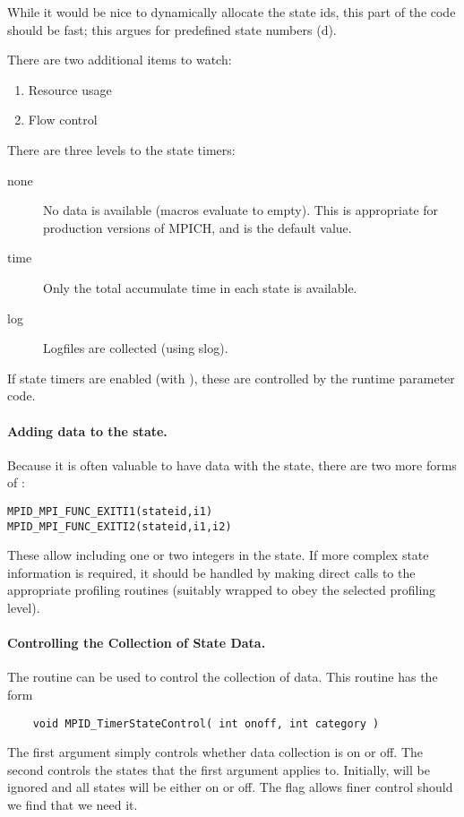 \documentclass{article}
\begin{document}
While it would be nice to dynamically allocate the state ids, this part of the
code should be fast; this argues for predefined state numbers
(d).  

There are two additional items to watch:
\begin{enumerate}
\item Resource usage
\item Flow control
\end{enumerate}

There are three levels to the state timers:
\begin{description}
\item[none]No data is available (macros evaluate to empty).  This is
  appropriate for production versions of MPICH, and is the default value.
\item[time]Only the total accumulate time in each state is available.
\item[log]Logfiles are collected (using slog).
\end{description}
If state timers are enabled (with ), these are
controlled by the runtime parameter code.

\paragraph{Adding data to the state.}
Because it is often valuable to have data with the state, there are
two more forms of :
\begin{verbatim}
MPID_MPI_FUNC_EXITI1(stateid,i1)
MPID_MPI_FUNC_EXITI2(stateid,i1,i2)
\end{verbatim}
These allow including one or two integers in the state.  If more
complex state information is required, it should be handled by making
direct calls to the appropriate profiling routines (suitably wrapped
to obey the selected profiling level).

\paragraph{Controlling the Collection of State Data.}
The routine  can be used to control the
collection of data.  This routine has the form
\begin{verbatim}
    void MPID_TimerStateControl( int onoff, int category )
\end{verbatim}
The first argument simply controls whether data collection is on or
off.  The second controls the states that the first argument applies
to.  Initially,  will be ignored and all states will be
either on or off.  The  flag allows finer control
should we find that we need it.
\end{document}
